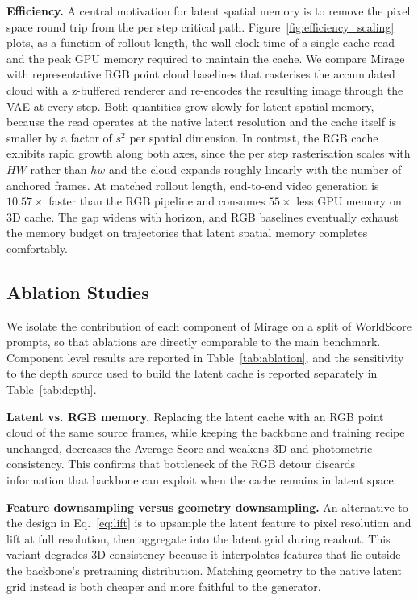 \documentclass{llmxive}
\providecommand{\method}{Mirage\xspace}
\providecommand{\boldstart}[1]{\vspace{0.1in}\noindent\textbf{#1}}
\begin{document}
\boldstart{Efficiency.}
A central motivation for latent spatial memory is to remove the pixel space round trip from the per step critical path. Figure~\ref{fig:efficiency_scaling} plots, as a function of rollout length, the wall clock time of a single cache read and the peak GPU memory required to maintain the cache. We compare \method{} with representative RGB point cloud baselines that rasterises the accumulated cloud with a z-buffered renderer and re-encodes the resulting image through the VAE at every step. Both quantities grow slowly for latent spatial memory, because the read operates at the native latent resolution and the cache itself is smaller by a factor of $s^2$ per spatial dimension. In contrast, the RGB cache exhibits rapid growth along both axes, since the per step rasterisation scales with $HW$ rather than $hw$ and the cloud expands roughly linearly with the number of anchored frames. At matched rollout length, end-to-end video generation is $10.57\times$ faster than the RGB pipeline and consumes $55\times$ less GPU memory on 3D cache. The gap widens with horizon, and RGB baselines eventually exhaust the memory budget on trajectories that latent spatial memory completes comfortably. 


\subsection{Ablation Studies}
\label{sec:exp:ablation}

We isolate the contribution of each component of \method{} on a split of WorldScore prompts, so that ablations are directly comparable to the main benchmark. Component level results are reported in Table~\ref{tab:ablation}, and the sensitivity to the depth source used to build the latent cache is reported separately in Table~\ref{tab:depth}.

\boldstart{Latent vs. RGB memory.}
Replacing the latent cache with an RGB point cloud of the same source frames, while keeping the backbone and training recipe unchanged, decreases the Average Score and weakens 3D and photometric consistency. This confirms that bottleneck of the RGB detour discards information that backbone can exploit when the cache remains in latent space.

\boldstart{Feature downsampling versus geometry downsampling.}
An alternative to the design in Eq.~\ref{eq:lift} is to upsample the latent feature to pixel resolution and lift at full resolution, then aggregate into the latent grid during readout. 
This variant degrades 3D consistency because it interpolates features that lie outside the backbone's pretraining distribution. 
Matching geometry to the native latent grid instead is both cheaper and more faithful to the generator.
\end{document}
